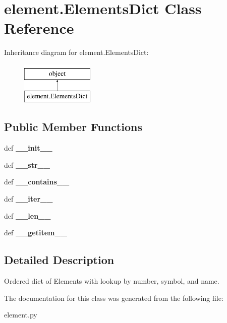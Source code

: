\hypertarget{classelement_1_1ElementsDict}{\section{element.\+Elements\+Dict Class Reference}
\label{classelement_1_1ElementsDict}
}
Inheritance diagram for element.\+Elements\+Dict\+:\begin{figure}[H]
\begin{center}
\leavevmode
\includegraphics[height=2.000000cm]{classelement_1_1ElementsDict}
\end{center}
\end{figure}
\subsection*{Public Member Functions}
\begin{DoxyCompactItemize}
\item 
\hypertarget{classelement_1_1ElementsDict_a1651fb045c87b116643c9ed3534a86ce}{def {\bfseries \+\_\+\+\_\+init\+\_\+\+\_\+}}\label{classelement_1_1ElementsDict_a1651fb045c87b116643c9ed3534a86ce}

\item 
\hypertarget{classelement_1_1ElementsDict_a74aee0774c62e6c87584e0d89d3b6704}{def {\bfseries \+\_\+\+\_\+str\+\_\+\+\_\+}}\label{classelement_1_1ElementsDict_a74aee0774c62e6c87584e0d89d3b6704}

\item 
\hypertarget{classelement_1_1ElementsDict_aa69d6a81b2a5051a6973126f9a2820b2}{def {\bfseries \+\_\+\+\_\+contains\+\_\+\+\_\+}}\label{classelement_1_1ElementsDict_aa69d6a81b2a5051a6973126f9a2820b2}

\item 
\hypertarget{classelement_1_1ElementsDict_a988599b55550e0707d9e2a3f2663ad67}{def {\bfseries \+\_\+\+\_\+iter\+\_\+\+\_\+}}\label{classelement_1_1ElementsDict_a988599b55550e0707d9e2a3f2663ad67}

\item 
\hypertarget{classelement_1_1ElementsDict_a9711622a1159982e5f1651381f764a7c}{def {\bfseries \+\_\+\+\_\+len\+\_\+\+\_\+}}\label{classelement_1_1ElementsDict_a9711622a1159982e5f1651381f764a7c}

\item 
\hypertarget{classelement_1_1ElementsDict_afa50a6c81f087a365b85fac399c5e399}{def {\bfseries \+\_\+\+\_\+getitem\+\_\+\+\_\+}}\label{classelement_1_1ElementsDict_afa50a6c81f087a365b85fac399c5e399}

\end{DoxyCompactItemize}


\subsection{Detailed Description}
\begin{DoxyVerb}Ordered dict of Elements with lookup by number, symbol, and name.\end{DoxyVerb}
 

The documentation for this class was generated from the following file\+:\begin{DoxyCompactItemize}
\item 
element.\+py\end{DoxyCompactItemize}

